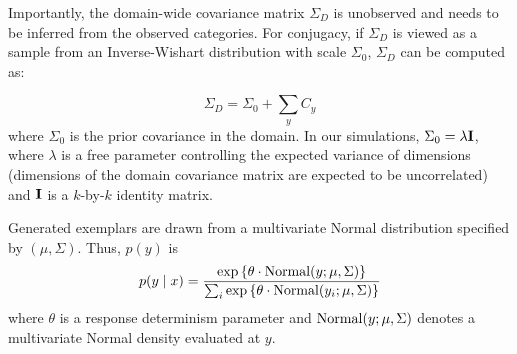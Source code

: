 \documentclass[12pt]{article}
\begin{document}
Importantly, the domain-wide covariance matrix $\Sigma_D$ is unobserved and needs to be inferred from the observed categories. For conjugacy, if $\Sigma_D$ is viewed as a sample from an Inverse-Wishart distribution with scale $\Sigma_0$, $\Sigma_D$ can be computed as:

 \begin{equation}
    \Sigma_D = \Sigma_0 + \sum_y{C_y}
    \label{eq:category_mus}
\end{equation}
% 
where $\Sigma_0$ is the prior covariance in the domain. In our simulations, $\Sigma_0 = \lambda {\bf I}$, where $\lambda$ is a free parameter controlling the expected variance of dimensions (dimensions of the domain covariance matrix are expected to be uncorrelated) and ${\bf I}$ is a $k$-by-$k$ identity matrix. 

Generated exemplars are drawn from a multivariate Normal distribution specified by $(\mu, \Sigma)$. Thus, $p(y)$ is
\begin{equation}
p(y \mid x) = \dfrac
{\exp \left \{ \theta \cdot {\rm Normal}(y; \mu, \Sigma) \right \} }
{\sum_i \exp \left \{ \theta \cdot {\rm Normal}(y_i; \mu, \Sigma) \right \} } 
\end{equation}
% 
where $\theta$ is a response determinism parameter and ${\rm Normal}(y; \mu, \Sigma)$ denotes a multivariate Normal density evaluated at $y$. 
\end{document}
